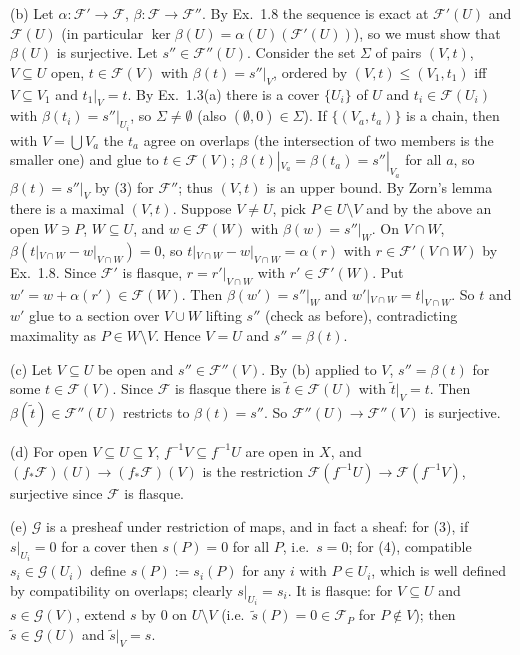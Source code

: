 \documentclass[11pt]{article}
\begin{document}
(b) Let $\alpha\colon\mathcal F'\to\mathcal F$, $\beta\colon\mathcal F\to\mathcal F''$. By Ex.~1.8 the sequence is exact at $\mathcal F'(U)$ and $\mathcal F(U)$ (in particular $\ker\beta(U)=\alpha(U)(\mathcal F'(U))$), so we must show that $\beta(U)$ is surjective. Let $s''\in\mathcal F''(U)$. Consider the set $\Sigma$ of pairs $(V,t)$, $V\subseteq U$ open, $t\in\mathcal F(V)$ with $\beta(t)=s''|_V$, ordered by $(V,t)\le(V_1,t_1)$ iff $V\subseteq V_1$ and $t_1|_V=t$. By Ex.~1.3(a) there is a cover $\{U_i\}$ of $U$ and $t_i\in\mathcal F(U_i)$ with $\beta(t_i)=s''|_{U_i}$, so $\Sigma\ne\emptyset$ (also $(\emptyset,0)\in\Sigma$). If $\{(V_a,t_a)\}$ is a chain, then with $V=\bigcup V_a$ the $t_a$ agree on overlaps (the intersection of two members is the smaller one) and glue to $t\in\mathcal F(V)$; $\beta(t)|_{V_a}=\beta(t_a)=s''|_{V_a}$ for all $a$, so $\beta(t)=s''|_V$ by (3) for $\mathcal F''$; thus $(V,t)$ is an upper bound. By Zorn's lemma there is a maximal $(V,t)$. Suppose $V\ne U$, pick $P\in U\setminus V$ and by the above an open $W\ni P$, $W\subseteq U$, and $w\in\mathcal F(W)$ with $\beta(w)=s''|_W$. On $V\cap W$, $\beta(t|_{V\cap W}-w|_{V\cap W})=0$, so $t|_{V\cap W}-w|_{V\cap W}=\alpha(r)$ with $r\in\mathcal F'(V\cap W)$ by Ex.~1.8. Since $\mathcal F'$ is flasque, $r=r'|_{V\cap W}$ with $r'\in\mathcal F'(W)$. Put $w'=w+\alpha(r')\in\mathcal F(W)$. Then $\beta(w')=s''|_W$ and $w'|_{V\cap W}=t|_{V\cap W}$. So $t$ and $w'$ glue to a section over $V\cup W$ lifting $s''$ (check as before), contradicting maximality as $P\in W\setminus V$. Hence $V=U$ and $s''=\beta(t)$.

(c) Let $V\subseteq U$ be open and $s''\in\mathcal F''(V)$. By (b) applied to $V$, $s''=\beta(t)$ for some $t\in\mathcal F(V)$. Since $\mathcal F$ is flasque there is $\tilde t\in\mathcal F(U)$ with $\tilde t|_V=t$. Then $\beta(\tilde t)\in\mathcal F''(U)$ restricts to $\beta(t)=s''$. So $\mathcal F''(U)\to\mathcal F''(V)$ is surjective.

(d) For open $V\subseteq U\subseteq Y$, $f^{-1}V\subseteq f^{-1}U$ are open in $X$, and $(f_*\mathcal F)(U)\to(f_*\mathcal F)(V)$ is the restriction $\mathcal F(f^{-1}U)\to\mathcal F(f^{-1}V)$, surjective since $\mathcal F$ is flasque.

(e) $\mathcal G$ is a presheaf under restriction of maps, and in fact a sheaf: for (3), if $s|_{U_i}=0$ for a cover then $s(P)=0$ for all $P$, i.e.\ $s=0$; for (4), compatible $s_i\in\mathcal G(U_i)$ define $s(P):=s_i(P)$ for any $i$ with $P\in U_i$, which is well defined by compatibility on overlaps; clearly $s|_{U_i}=s_i$. It is flasque: for $V\subseteq U$ and $s\in\mathcal G(V)$, extend $s$ by $0$ on $U\setminus V$ (i.e.\ $\tilde s(P)=0\in\mathcal F_P$ for $P\notin V$); then $\tilde s\in\mathcal G(U)$ and $\tilde s|_V=s$.
\end{document}
